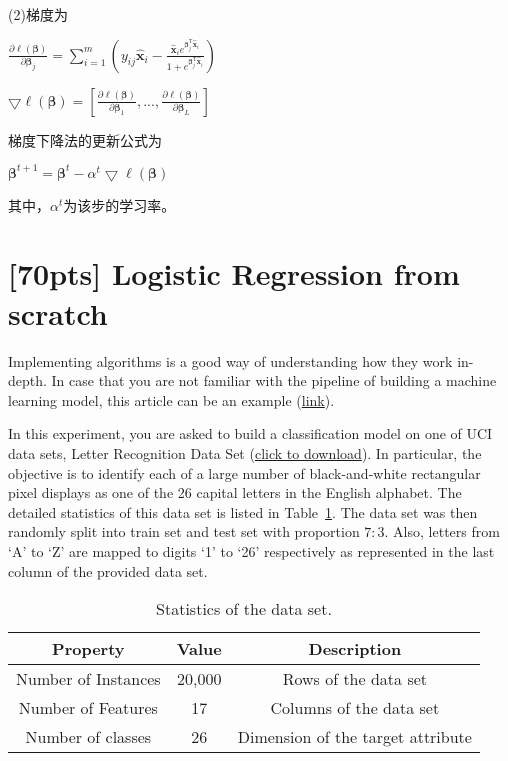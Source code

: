 \documentclass{article}
\begin{document}
(2)梯度为
\begin{spacing}{2.0}
$\frac{\partial\ell(\bm{\beta})}{\partial\bm{\beta}_j}
=\sum\limits_{i=1}^m(y_{ij}\bm{\hat{x}}_i-\frac{\bm{\hat{x}}_ie^{\bm{\beta}_j^\mathrm{T}\bm{\hat{x}}_i}}{1+e^{\bm{\beta}_j^\mathrm{T}\bm{\hat{x}}_i}})$

$\bigtriangledown\ell(\bm{\beta})=[\frac{\partial\ell(\bm{\beta})}{\partial\bm{\beta}_1},...,\frac{\partial\ell(\bm{\beta})}{\partial\bm{\beta}_L}]$
\end{spacing}

梯度下降法的更新公式为

$\bm{\beta}^{t+1}=\bm{\beta}^{t}-\alpha^t\bigtriangledown\ell(\bm{\beta})$

其中，$\alpha^t$为该步的学习率。






\newpage
{}
\section{[70pts] Logistic Regression from scratch  }
Implementing algorithms is a good way of understanding how they work in-depth. In case that you are not familiar with the pipeline of building a machine learning model, this article can be an example (\href{https://www.jianshu.com/p/ecb89148ed64}{link}).

In this experiment, you are asked to build a classification model on one of UCI data sets, Letter Recognition Data Set
(\href{https://box.nju.edu.cn/f/0fdece85a4654d8b94c1/?dl=1}{click to download}). In particular, the objective is to identify each of a large number of black-and-white
rectangular pixel displays as one of the 26 capital letters in the English alphabet. The detailed statistics of this data set is listed in Table~\ref{tab:dataset}. The data set was then randomly split into train set and test set with proportion $7:3$. Also, letters from `A' to `Z' are mapped to digits `1' to `26' respectively as represented in the last column of the provided data set.


\begin{table}[!ht]
    \centering
    \caption{Statistics of the data set.}
    \vspace{2mm}
    \label{tab:dataset}
    \begin{tabular}{|c|c|c|}
    \hline
    Property & Value & Description\\
    \hline
        Number of Instances & 20,000 & Rows of the data set\\
    \hline
        Number of Features & 17 & Columns of the data set\\
    \hline
        Number of classes & 26 & Dimension of the target attribute \\
    \hline
    \end{tabular}
\end{table}
\end{document}

